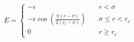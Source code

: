 \documentclass[12pt]{article}
\begin{document}
\begin{align*}
E = 
\begin{cases}
-\epsilon& \quad r < \sigma \\
-\epsilon\cos\left(\frac{\pi\left(r - \sigma\right)}{2\left(r_c - \sigma\right)}\right)&\quad \sigma \leq r < r_c \\
0& \quad r \geq r_c
\end{cases}
\end{align*}
\end{document}
